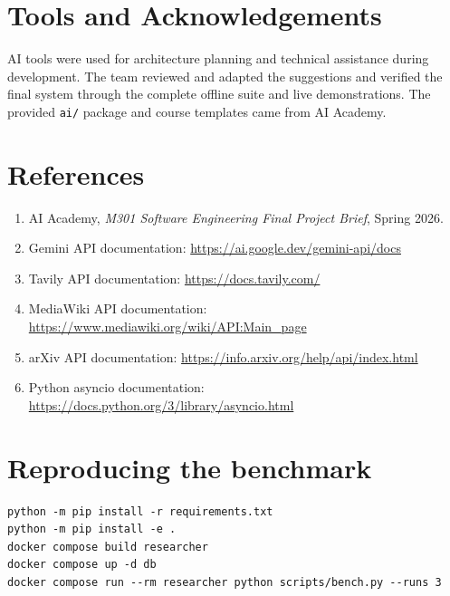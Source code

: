 \documentclass[11pt,a4paper]{article}
\begin{document}
\section{Tools and Acknowledgements}
AI tools were used for architecture planning and technical assistance during development. The team
reviewed and adapted the suggestions and verified the final system through the complete offline
suite and live demonstrations. The provided \texttt{ai/} package and course templates came from
AI Academy.

\section*{References}
\begin{enumerate}
  \item AI Academy, \emph{M301 Software Engineering Final Project Brief}, Spring 2026.
  \item Gemini API documentation: \url{https://ai.google.dev/gemini-api/docs}
  \item Tavily API documentation: \url{https://docs.tavily.com/}
  \item MediaWiki API documentation: \url{https://www.mediawiki.org/wiki/API:Main_page}
  \item arXiv API documentation: \url{https://info.arxiv.org/help/api/index.html}
  \item Python asyncio documentation: \url{https://docs.python.org/3/library/asyncio.html}
\end{enumerate}

\appendix
\section{Reproducing the benchmark}
\begin{verbatim}
python -m pip install -r requirements.txt
python -m pip install -e .
docker compose build researcher
docker compose up -d db
docker compose run --rm researcher python scripts/bench.py --runs 3
\end{verbatim}
\end{document}
